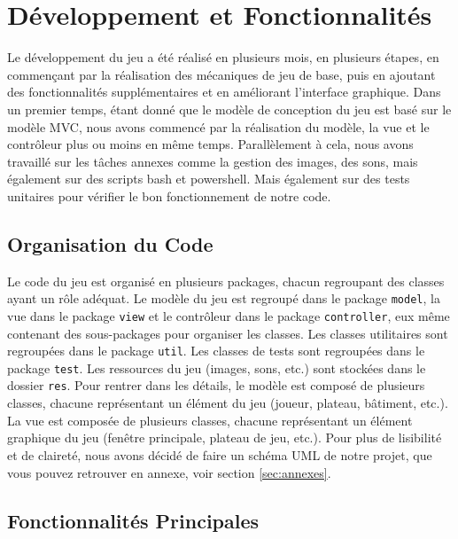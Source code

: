 \documentclass{article}
\begin{document}
    \section{Développement et Fonctionnalités}\label{sec:developpement-et-fonctionnalites}

    Le développement du jeu a été réalisé en plusieurs mois, en plusieurs étapes, en commençant par la réalisation des mécaniques de jeu de base, puis en ajoutant des fonctionnalités supplémentaires et en améliorant l'interface graphique.
    Dans un premier temps, étant donné que le modèle de conception du jeu est basé sur le modèle MVC, nous avons commencé par la réalisation du modèle, la vue et le contrôleur plus ou moins en même temps.
    Parallèlement à cela, nous avons travaillé sur les tâches annexes comme la gestion des images, des sons, mais également sur des scripts bash et powershell.
    Mais également sur des tests unitaires pour vérifier le bon fonctionnement de notre code.

    \subsection{Organisation du Code}\label{subsec:organisation-du-code}

    Le code du jeu est organisé en plusieurs packages, chacun regroupant des classes ayant un rôle adéquat.
    Le modèle du jeu est regroupé dans le package \texttt{model}, la vue dans le package \texttt{view} et le contrôleur dans le package \texttt{controller}, eux même contenant des sous-packages pour organiser les classes.
    Les classes utilitaires sont regroupées dans le package \texttt{util}.
    Les classes de tests sont regroupées dans le package \texttt{test}.
    Les ressources du jeu (images, sons, etc.) sont stockées dans le dossier \texttt{res}.
    Pour rentrer dans les détails, le modèle est composé de plusieurs classes, chacune représentant un élément du jeu (joueur, plateau, bâtiment, etc.).
    La vue est composée de plusieurs classes, chacune représentant un élément graphique du jeu (fenêtre principale, plateau de jeu, etc.).
    Pour plus de lisibilité et de claireté, nous avons décidé de faire un schéma UML de notre projet, que vous pouvez retrouver en annexe, voir section \ref{sec:annexes}.

    \subsection{Fonctionnalités Principales}\label{subsec:fonctionnalites-principales}
\end{document}
